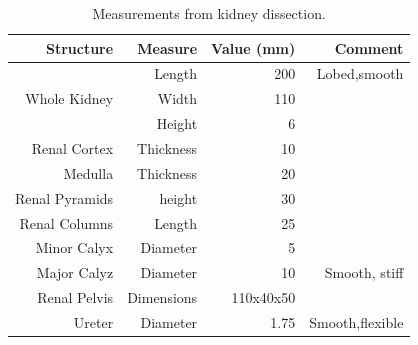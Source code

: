 \documentclass[12pt]{article}
\begin{document}
\begin{table}[H]
\centering{}
\caption{Measurements from kidney dissection.}
\label{tab:kid}
\begin{tabular}{|r|r|r|r|}
	\hline
	Structure & Measure & Value (mm) & Comment\\
	\hline
	\hline
	\multirow{3}{*}{Whole Kidney}
	&Length&200&Lobed,smooth\\
	&Width&110&\\
	&Height&6&\\
	\hline
	Renal Cortex&Thickness&10&\\
	\hline
	Medulla&Thickness&20&\\

	\hline
	Renal Pyramids&height&30&\\	
	\hline
	Renal Columns&Length&25&\\
	\hline
	Minor Calyx&Diameter&5&\\
	\hline
	Major Calyz&Diameter&10&Smooth, stiff\\
	\hline
	Renal Pelvis&Dimensions&110x40x50&\\
	\hline
	Ureter&Diameter&1.75&Smooth,flexible\\
	\hline
	
\end{tabular}
\end{table}
\end{document}
